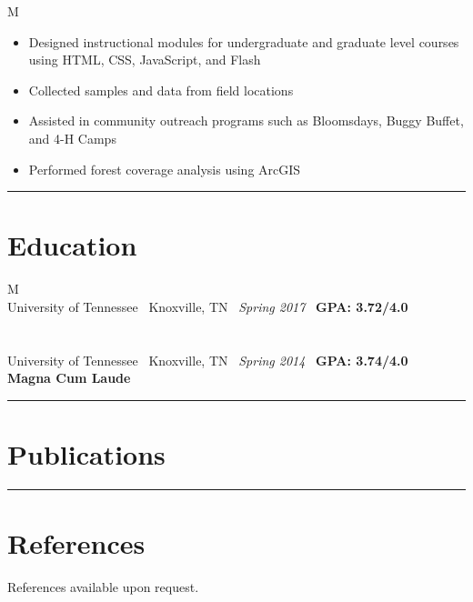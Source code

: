 \documentclass[10pt]{article}%
\begin{document}
\begin{tabularx}{\linewidth}{M}
        \begin{itemize}[topsep=-12pt,parsep=0em]
        	    \setlength\itemsep{0em}
        	    \item Designed instructional modules for undergraduate and graduate level courses using HTML, CSS, JavaScript, and Flash
        	    \item Collected samples and data from field locations
        	    \item Assisted in community outreach programs such as Bloomsdays, Buggy Buffet, and 4-H Camps
        	    \item Performed forest coverage analysis using ArcGIS
        \end{itemize}
    \end{tabularx}
\par\noindent\rule{\textwidth}{0.4pt}
\section*{\faUniversity{} Education}
     \begin{tabularx}{\linewidth}{M}%
       \\
      University of Tennessee \textemdash ~Knoxville, TN \textemdash ~\textit{Spring 2017} \textemdash ~\textbf{GPA: 3.72/4.0} \\
      \\
       \\
      University of Tennessee \textemdash ~Knoxville, TN \textemdash ~\textit{Spring 2014} \textemdash ~\textbf{GPA: 3.74/4.0} \\
      \textbf{Magna Cum Laude} \\
    \end{tabularx}%
\par\noindent\rule{\textwidth}{0.4pt}
\section*{\faBook{} Publications}
\nocite{*}

\par\noindent\rule{\textwidth}{0.4pt}
\section*{\faUserPlus{} References}
References available upon request.
\end{document}
